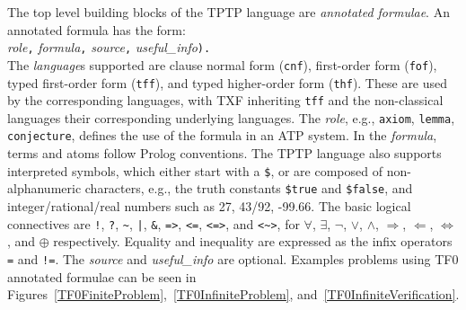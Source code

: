 \documentclass[letterpaper]{article}
\begin{document}
The top level building blocks of the TPTP language are {\em annotated
formulae}.
An annotated formula has the form:\\
{\em role}{\tt ,}
{\em formula}{\tt ,}
{\em source}{\tt ,}
{\em useful\_info}{\tt ).}\\
The {\em language}s supported are clause normal form ({\tt cnf}), first-order form ({\tt fof}), 
typed first-order form ({\tt tff}), and typed higher-order form ({\tt thf}).
These are used by the corresponding languages, with TXF inheriting {\tt tff} and the non-classical 
languages their corresponding underlying languages.
The {\em role}, e.g., {\tt axiom}, {\tt lemma}, {\tt conjecture},
defines the use of the formula in an ATP system.
In the {\em formula}, terms and atoms follow Prolog conventions.
The TPTP language also supports interpreted symbols, which either start with a
{\tt \$}, or are composed of non-alphanumeric characters, e.g., the truth
constants {\tt \$true} and {\tt \$false}, and integer/rational/real
numbers such as 27, 43/92, -99.66.
The basic logical connectives are
{\tt !}, {\tt ?}, {\tt \verb|~|}, {\tt |}, {\tt \&}, {\tt =>}, {\tt <=},
{\tt <=>}, and {\tt <\verb|~|>},
for
$\forall$, $\exists$, $\neg$, $\vee$, $\wedge$, $\Rightarrow$, $\Leftarrow$,
$\Leftrightarrow$, and $\oplus$ respectively.
Equality and inequality are expressed as the infix operators {\tt =} and
{\tt !=}.
The {\em source} and {\em useful\_info} are optional.
Examples problems using TF0 annotated formulae can be seen in 
Figures~\ref{TF0FiniteProblem},~\ref{TF0InfiniteProblem}, and~\ref{TF0InfiniteVerification}.
\end{document}
